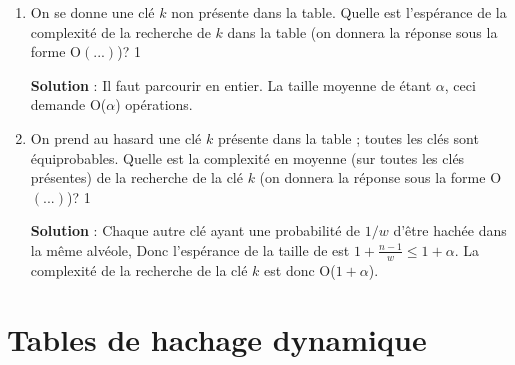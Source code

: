 \documentclass[10pt,a4paper, varwidth]{article}
\def\cor{1}
\begin{document}
	\begin{enumerate}
		\item On se donne une clé $k$ non présente dans la table. Quelle est l'espérance de la complexité de la
		recherche de $k$ dans la table (on donnera la réponse sous la forme O$(...)$)?
        \if\cor1
        \begin{emphase}
            \textbf{Solution} : Il faut parcourir  en entier. La taille moyenne
            de  étant $\alpha$, ceci demande O($\alpha$) opérations.
        \end{emphase}
        \fi
		\item On prend au hasard une clé $k$ présente dans la table ; toutes les clés sont équiprobables. 
        Quelle est la complexité en moyenne (sur toutes les clés présentes) de
		la recherche de la clé $k$ (on donnera la réponse sous la forme O$(...)$)?
        \if\cor1
        \begin{emphase}
            \textbf{Solution} : Chaque autre clé ayant une probabilité de $1/w$ d'être hachée dans la même alvéole,
            Donc l'espérance de la taille de  est $1 + \frac{n - 1}{w} \leq 1 + \alpha$.
            La complexité de la recherche de la clé $k$ est donc O($1 + \alpha$).
        \end{emphase}
        \fi
	\end{enumerate}
	
	\section{Tables de hachage dynamique}
	
\end{document}
